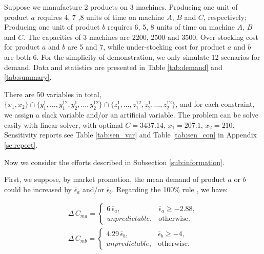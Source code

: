 \documentclass[a4paper,11pt]{article}
\begin{document}
\begin{table}[ht]
\caption{Demand Realisations: Statistical Summary}
\label{tab:summary}
\centering
{}
\end{table}

Suppose we manufacture 2 products on 3 machines. Producing one unit of product $a$ requires 4, 7 ,8 units of time on machine $A$, $B$ and $C$, respectively; Producing one unit of product $b$ requires 6, 5, 8 units of time on machine $A$, $B$ and $C$. The capacities of 3 machines are 2200, 2500 and 3500. Over-stocking cost for product $a$ and $b$ are 5 and 7, while under-stocking cost for product $a$ and $b$ are both 6. For the simplicity of demonstration, we only simulate 12 scenarios for demand. Data and statistics are presented in Table \ref{tab:demand} and \ref{tab:summary}.

There are 50 variables in total, $\big\{ x_1,x_2 \big\} \cap \big\{ y_1^1,\dots,y_1^{12},y_2^1,\dots,y_2^{12} \big\} \cap \big\{ z_1^1,\dots,z_1^{12},z_2^1,\dots,z_2^{12} \big\}$, and for each constraint, we assign a slack variable and/or an artificial variable. The problem can be solve easily with linear solver, with optimal $C=3437.14$, $x_1=207.1$, $x_2=210$. Sensitivity reports see Table \ref{tab:sen_var} and Table \ref{tab:sen_con} in Appendix \ref{se:report}.

Now we consider the efforts described in Subsection \ref{sub:information}.

First, we suppose, by market promotion, the mean demand of product $a$ or $b$ could be increased by $\bar{\epsilon}_a$ and/or $\bar{\epsilon}_b$. Regarding the 100\% rule \cite{BHM77}, we have:

\[
\begin{aligned}
    \Delta \, C_{ma} = 
    \begin{cases}
        6 \, \bar{\epsilon}_a, & \bar{\epsilon}_a \geq -2.88,\\
        unpredictable, & \text{otherwise}.
    \end{cases}\\
    \Delta \, C_{mb} = 
    \begin{cases}
        4.29 \, \bar{\epsilon}_b, & \bar{\epsilon}_b \geq -4,\\
        unpredictable, & \text{otherwise}.
    \end{cases}
\end{aligned}
\]
\end{document}
